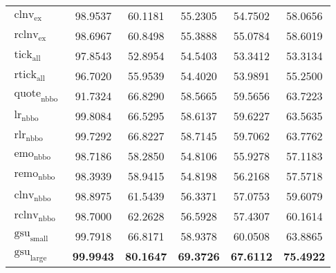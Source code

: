 \begin{table}[ht]
\begin{tabular}{@{}lSSSSS@{}}
        $\operatorname{clnv}_{\mathrm{ex}}$    & 98.9537           & 60.1181                            & 55.2305           & 54.7502           & 58.0656           \\
        $\operatorname{rclnv}_{\mathrm{ex}}$   & 98.6967           & 60.8498                            & 55.3888           & 55.0784           & 58.6019           \\ \addlinespace
        $\operatorname{tick}_{\mathrm{all}}$   & 97.8543           & 52.8954                            & 54.5403           & 53.3412           & 53.3134           \\
        $\operatorname{rtick}_{\mathrm{all}}$  & 96.7020           & 55.9539                            & 54.4020           & 53.9891           & 55.2500           \\ \addlinespace
        $\operatorname{quote}_{\mathrm{nbbo}}$ & 91.7324           & 66.8290                            & 58.5665           & 59.5656           & 63.7223           \\
        $\operatorname{lr}_{\mathrm{nbbo}}$    & 99.8084           & 66.5295                            & 58.6137           & 59.6227           & 63.5635           \\
        $\operatorname{rlr}_{\mathrm{nbbo}}$   & 99.7292           & 66.8227                            & 58.7145           & 59.7062           & 63.7762           \\
        $\operatorname{emo}_{\mathrm{nbbo}}$   & 98.7186           & 58.2850                            & 54.8106           & 55.9278           & 57.1183           \\
        $\operatorname{remo}_{\mathrm{nbbo}}$  & 98.3939           & 58.9415                            & 54.8198           & 56.2168           & 57.5718           \\
        $\operatorname{clnv}_{\mathrm{nbbo}}$  & 98.8975           & 61.5439                            & 56.3371           & 57.0753           & 59.6079           \\
        $\operatorname{rclnv}_{\mathrm{nbbo}}$ & 98.7000           & 62.2628                            & 56.5928           & 57.4307           & 60.1614           \\ \addlinespace
        $\operatorname{gsu}_{\mathrm{small}}$  & 99.7918           & 66.8171                            & 58.9378           & 60.0508           & 63.8865           \\
        $\operatorname{gsu}_{\mathrm{large}}$  & \bfseries 99.9943 & \bfseries 80.1647                  & \bfseries 69.3726 & \bfseries 67.6112 & \bfseries 75.4922 \\
        \bottomrule
    \end{tabular}
\end{table}

